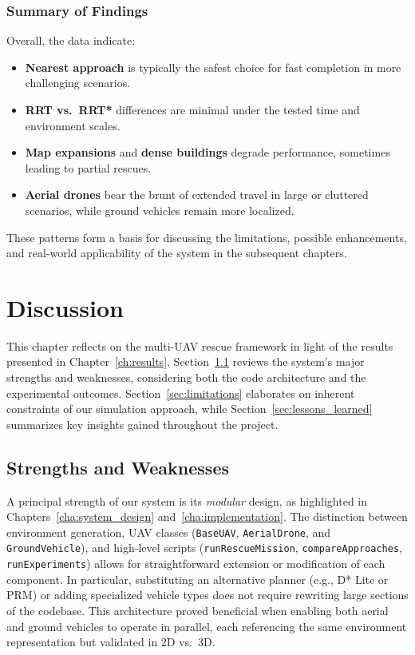 \documentclass[12pt,a4paper]{report}
\begin{document}
\subsection{Summary of Findings}
Overall, the data indicate:
\begin{itemize}
    \item \textbf{Nearest approach} is typically the safest choice for fast completion 
          in more challenging scenarios.
    \item \textbf{RRT vs.\ RRT*} differences are minimal under the tested time and 
          environment scales.
    \item \textbf{Map expansions} and \textbf{dense buildings} degrade performance, 
          sometimes leading to partial rescues.
    \item \textbf{Aerial drones} bear the brunt of extended travel in large or 
          cluttered scenarios, while ground vehicles remain more localized.
\end{itemize}
These patterns form a basis for discussing the limitations, possible enhancements, 
and real-world applicability of the system in the subsequent chapters.
\chapter{Discussion}
\label{ch:discussion}

This chapter reflects on the multi-UAV rescue framework in light of the results presented 
in Chapter~\ref{ch:results}. Section~\ref{sec:strengths_weaknesses} reviews the system's 
major strengths and weaknesses, considering both the code architecture and the 
experimental outcomes. Section~\ref{sec:limitations} elaborates on inherent constraints 
of our simulation approach, while Section~\ref{sec:lessons_learned} summarizes key 
insights gained throughout the project.

\section{Strengths and Weaknesses}
\label{sec:strengths_weaknesses}
A principal strength of our system is its \emph{modular} design, as highlighted in 
Chapters~\ref{cha:system_design} and~\ref{cha:implementation}. The distinction between 
environment generation, UAV classes (\texttt{BaseUAV}, \texttt{AerialDrone}, and 
\texttt{GroundVehicle}), and high-level scripts (\texttt{runRescueMission}, 
\texttt{compareApproaches}, \texttt{runExperiments}) allows for straightforward 
extension or modification of each component. In particular, substituting an alternative 
planner (e.g., D* Lite or PRM) or adding specialized vehicle types does not require 
rewriting large sections of the codebase. This architecture proved beneficial when 
enabling both aerial and ground vehicles to operate in parallel, each referencing the 
same environment representation but validated in 2D vs.\ 3D.
\end{document}
